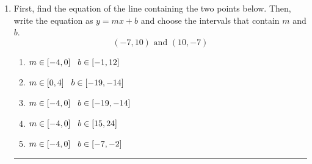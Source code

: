 \documentclass[14pt]{extbook}
\newcommand{\litem}[1]{\item#1\hspace*{-1cm}\rule{\textwidth}{0.4pt}}
\begin{document}
\begin{enumerate}
{\begin{enumerate}[label=\Alph*.]
\end{enumerate} }
\litem{
First, find the equation of the line containing the two points below. Then, write the equation as $ y=mx+b $ and choose the intervals that contain $m$ and $b$.\[ (-7, 10) \text{ and } (10, -7) \]\begin{enumerate}[label=\Alph*.]
\item \( m \in [-4, 0] \hspace*{3mm} b \in [-1, 12] \)
\item \( m \in [0, 4] \hspace*{3mm} b \in [-19, -14] \)
\item \( m \in [-4, 0] \hspace*{3mm} b \in [-19, -14] \)
\item \( m \in [-4, 0] \hspace*{3mm} b \in [15, 24] \)
\item \( m \in [-4, 0] \hspace*{3mm} b \in [-7, -2] \)

\end{enumerate} }
\end{enumerate}
\end{document}
